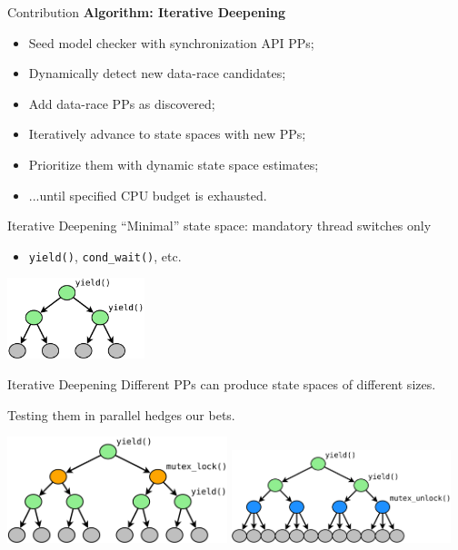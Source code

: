 \documentclass[xcolor=dvipsnames]{beamer}
\begin{document}


\begin{frame}{Contribution}
	\textbf{Algorithm: Iterative Deepening}
	\begin{itemize}
		\item Seed model checker with synchronization API PPs;
		\item Dynamically detect new data-race candidates;
		\item Add data-race PPs as discovered;
		\item Iteratively advance to state spaces with new PPs;
		\item Prioritize them with dynamic state space estimates;
		\item ...until specified CPU budget is exhausted.
	\end{itemize}
\end{frame}

\begin{frame}{Iterative Deepening}
	``Minimal'' state space: mandatory thread switches only
	\begin{itemize}
		\item \texttt{yield()}, \texttt{cond\_wait()}, etc.
	\end{itemize}
	\linegap

	\begin{center}
		\includegraphics[width=0.3\textwidth]{tree0.pdf}
	\end{center}
\end{frame}

\begin{frame}{Iterative Deepening}
	Different PPs can produce state spaces of different sizes.
	\linegap

	Testing them in parallel hedges our bets.
	\linegap

	\begin{center}
		\includegraphics[width=0.48\textwidth]{tree1.pdf}
		\quad
		\includegraphics[width=0.48\textwidth]{tree2.pdf}
	\end{center}
\end{frame}
\end{document}
